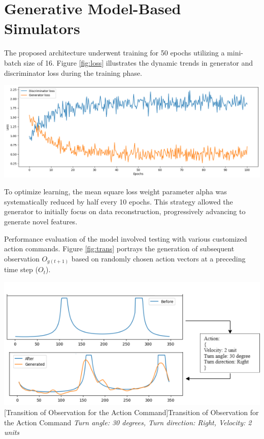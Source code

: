 \documentclass[12pt,twoside,a4paper,parskip]{scrbook} %
\begin{document}
\section{Generative Model-Based Simulators}
The proposed architecture underwent training for 50 epochs utilizing a mini-batch size of 16. Figure \ref{fig:loss} illustrates the dynamic trends in generator and discriminator loss during the training phase.

\begin{minipage}[t]{\linewidth}
        \centering
        \includegraphics[width=1\textwidth]{Images/loss.png}
        \label{fig:loss}
        \vspace{-\baselineskip} %
    \end{minipage}
    \hfill

To optimize learning, the mean square loss weight parameter alpha was systematically reduced by half every 10 epochs. This strategy allowed the generator to initially focus on data reconstruction, progressively advancing to generate novel features.

Performance evaluation of the model involved testing with various customized action commands. Figure \ref{fig:trans} portrays the generation of subsequent observation $O_{g(t+1)}$ based on randomly chosen action vectors at a preceding time step ($O_{t}$).

\begin{minipage}[t]{\linewidth}
        \centering
        \includegraphics[width=1\textwidth]{Images/act_trans.png}
        [Transition of Observation for the Action Command]{Transition of Observation for the Action Command \textit{{Turn angle: 30 degrees, Turn direction: Right, Velocity: 2 units}}}
        \label{fig:trans}
        \vspace{-\baselineskip} %
    \end{minipage}
    \hfill
\end{document}
